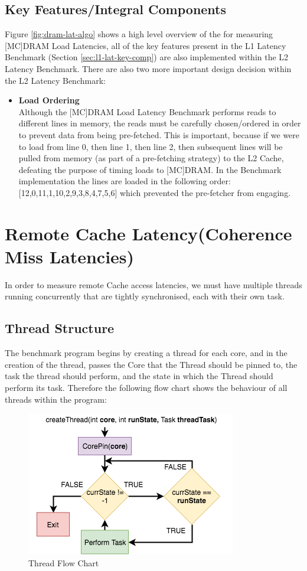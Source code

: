 \documentclass[bsc,frontabs,twoside,singlespacing,parskip,deptreport]{infthesis}     %
\begin{document}
\subsection{Key Features/Integral Components}\label{sec:mem-lat-key-comp}
Figure \ref{fig:dram-lat-algo} shows a high level overview of the for measuring [MC]DRAM Load Latencies, all of the key features present in the L1 Latency Benchmark (Section \ref{sec:l1-lat-key-comp}) are also implemented within the L2 Latency Benchmark. There are also two more important design decision within the L2 Latency Benchmark:
\begin{itemize}
    \item{{\bf Load Ordering} \\
    Although the [MC]DRAM Load Latency Benchmark performs reads to different lines in memory, the reads must be carefully chosen/ordered in order to prevent data from being pre-fetched. This is important, because if we were to load from line 0, then line 1, then line 2, then subsequent lines will be pulled from memory (as part of a pre-fetching strategy) to the L2 Cache, defeating the purpose of timing loads to [MC]DRAM. In the Benchmark implementation the lines are loaded in the following order: [12,0,11,1,10,2,9,3,8,4,7,5,6] which prevented the pre-fetcher from engaging.}
\end{itemize}

\newpage

\section{Remote Cache Latency(Coherence Miss Latencies)}\label{coherence-latencies}
In order to measure remote Cache access latencies, we must have multiple threads running concurrently that are tightly synchronised, each with their own task.

\subsection{Thread Structure}
 The benchmark program begins by creating a thread for each core, and in the creation of the thread, passes the Core that the Thread should be pinned to, the task the thread should perform, and the state in which the Thread should perform its task. Therefore the following flow chart shows the behaviour of all threads within the program:

\begin{figure}[!h]
    \centering
    \includegraphics{Thread_Structure.png}
    \caption{Thread Flow Chart}
    \label{fig:thread-flowchart}
\end{figure}
\end{document}
